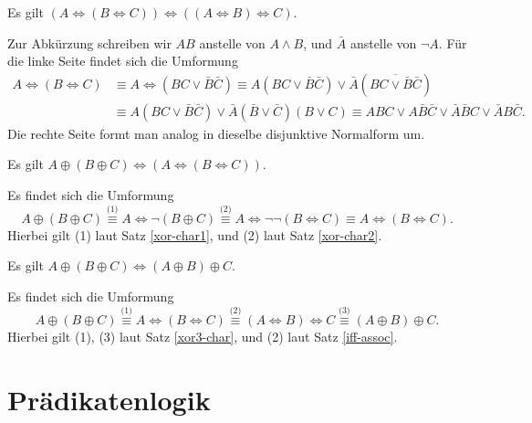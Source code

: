 \begin{Satz}\label{iff-assoc}\strong{[LEM]}
Es gilt $(A\Leftrightarrow (B\Leftrightarrow C))\Leftrightarrow
((A\Leftrightarrow B)\Leftrightarrow C)$.
\end{Satz}
\begin{Beweis}
Zur Abkürzung schreiben wir $AB$ anstelle von $A\land B$,
und $\bar A$ anstelle von $\neg A$. Für die linke Seite findet sich die
Umformung
\begin{align*}
A\Leftrightarrow (B\Leftrightarrow C)
&\equiv A\Leftrightarrow (BC \lor \bar B\bar C)
\equiv A(BC\lor\bar B\bar C)\lor \bar A(\overline{BC\lor\bar B\bar C})\\
&\equiv A(BC\lor\bar B\bar C)\lor \bar A(\bar B\lor \bar C)(B\lor C)
\equiv ABC\lor A\bar B\bar C\lor \bar A\bar BC\lor\bar AB\bar C.
\end{align*}
Die rechte Seite formt man analog in dieselbe disjunktive Normalform
um.\,\qedsymbol
\end{Beweis}

\begin{Satz}\label{xor3-char}\strong{[LEM]}
Es gilt $A\oplus (B\oplus C)\Leftrightarrow (A\Leftrightarrow (B\Leftrightarrow C))$.
\end{Satz}
\begin{Beweis}
Es findet sich die Umformung
\[A\oplus (B\oplus C)\stackrel{\text{(1)}}\equiv
A\Leftrightarrow \neg (B\oplus C)
\stackrel{\text{(2)}}\equiv A\Leftrightarrow\neg\neg (B\Leftrightarrow C)
\equiv A\Leftrightarrow (B\Leftrightarrow C).\]
Hierbei gilt (1) laut Satz \ref{xor-char1}, und (2) laut Satz
\ref{xor-char2}.\,\qedsymbol
\end{Beweis}

\begin{Satz}\label{xor-assoc}\strong{[LEM]}
Es gilt $A\oplus (B\oplus C)\Leftrightarrow (A\oplus B)\oplus C$.
\end{Satz}
\begin{Beweis}
Es findet sich die Umformung
\[A\oplus (B\oplus C)\stackrel{\text{(1)}}\equiv A\Leftrightarrow (B\Leftrightarrow C)
\stackrel{\text{(2)}}\equiv (A\Leftrightarrow B)\Leftrightarrow C
\stackrel{\text{(3)}}\equiv (A\oplus B)\oplus C.\]
Hierbei gilt (1), (3) laut Satz \ref{xor3-char},
und (2) laut Satz \ref{iff-assoc}.\,\qedsymbol
\end{Beweis}

\newpage
\section{Prädikatenlogik}

